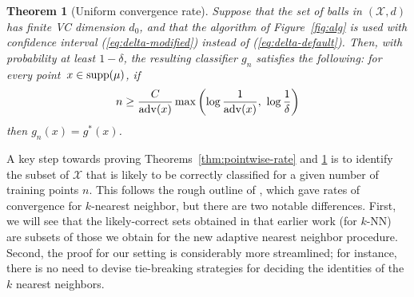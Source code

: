 \documentclass{article}
\def\X{{\mathcal X}}
\def\supp{{\rm supp}}
\def\adv{{\rm adv}}
\newtheorem{theorem}{Theorem}
\newcommand{\comment}[3]{{\color{#1} {\bf #2 :} #3}}
\newcommand{\shay}[1]{\comment{purple}{Shay}{#1}}
\begin{document}


\begin{theorem} [Uniform convergence rate]
Suppose that the set of balls in $(\X,d)$ has finite VC dimension $d_0$, and that the algorithm of Figure~\ref{fig:alg} is used with confidence interval (\ref{eq:delta-modified}) instead of (\ref{eq:delta-default}). 
Then, with probability at least $1-\delta$, the resulting classifier $g_n$ satisfies the following: 
for every point~$x\in\supp(\mu)$, if
\[n \geq \frac{C}{\adv(x)} \max \left( \log \frac{1}{\adv(x)}, \ \log \frac{1}{\delta} \right)\]
then $g_n(x)=g^*(x)$.
\label{thm:uniform-rate}
\end{theorem}


A key step towards proving Theorems~\ref{thm:pointwise-rate} and \ref{thm:uniform-rate} is to identify the subset of $\X$ that is likely to be correctly classified for a given number of training points $n$. This follows the rough outline of \cite{ChaudhuriDasgupta2014}, which gave rates of convergence for $k$-nearest neighbor, but there are two notable differences. First, we will see that the likely-correct sets obtained in that earlier work (for $k$-NN) are subsets of those we obtain for the new adaptive nearest neighbor procedure. Second, the proof for our setting is considerably more streamlined; for instance, there is no need to devise tie-breaking strategies for deciding the identities of the $k$ nearest neighbors.
\end{document}
